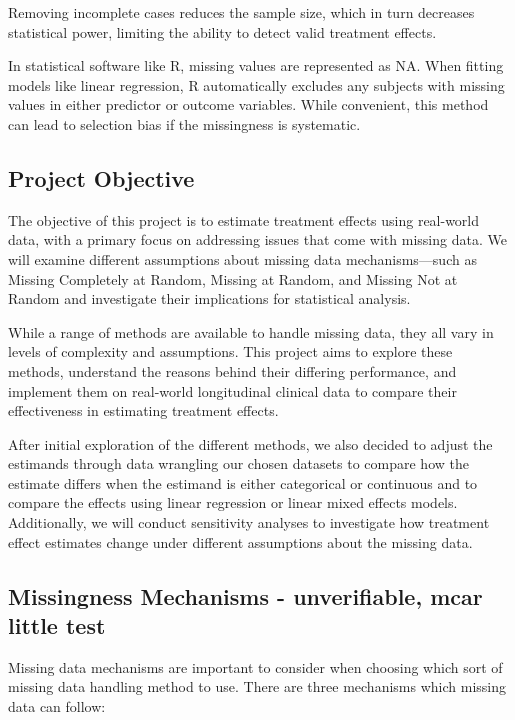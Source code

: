 \documentclass{article}
\begin{document}
Removing incomplete cases reduces the sample size, which in turn
decreases statistical power, limiting the ability to detect valid
treatment effects.

In statistical software like R, missing values are represented as NA.
When fitting models like linear regression, R automatically excludes any
subjects with missing values in either predictor or outcome variables.
While convenient, this method can lead to selection bias if the
missingness is systematic.

\subsection{Project Objective}\label{project-objective}

The objective of this project is to estimate treatment effects using
real-world data, with a primary focus on addressing issues that come
with missing data. We will examine different assumptions about missing
data mechanisms---such as Missing Completely at Random, Missing at
Random, and Missing Not at Random and investigate their implications for
statistical analysis.

While a range of methods are available to handle missing data, they all
vary in levels of complexity and assumptions. This project aims to
explore these methods, understand the reasons behind their differing
performance, and implement them on real-world longitudinal clinical data
to compare their effectiveness in estimating treatment effects.

After initial exploration of the different methods, we also decided to
adjust the estimands through data wrangling our chosen datasets to
compare how the estimate differs when the estimand is either categorical
or continuous and to compare the effects using linear regression or
linear mixed effects models. Additionally, we will conduct sensitivity
analyses to investigate how treatment effect estimates change under
different assumptions about the missing data.

\subsection{Missingness Mechanisms - unverifiable, mcar little
test}\label{missingness-mechanisms---unverifiable-mcar-little-test}

Missing data mechanisms are important to consider when choosing which
sort of missing data handling method to use. There are three mechanisms
which missing data can follow:
\end{document}
